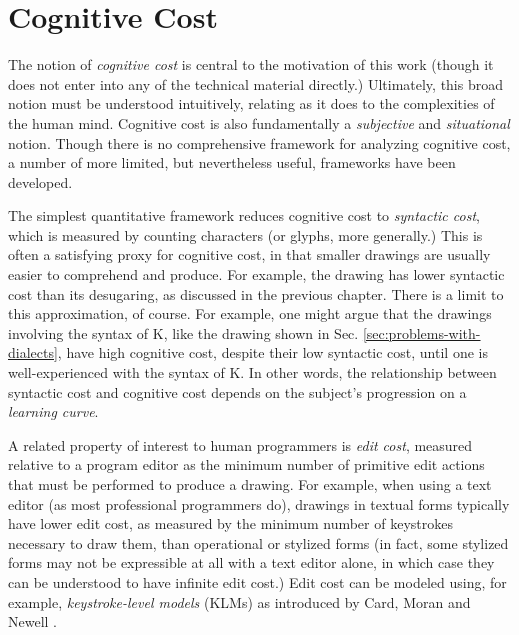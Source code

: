 
\section{Cognitive Cost}\label{sec:syntactic-properties}
The notion of \emph{cognitive cost} is central to the motivation of this work (though it does not enter into any of the technical material directly.) Ultimately, this broad notion must be understood intuitively, relating as it does to the complexities of the human mind. Cognitive cost is also fundamentally a \emph{subjective} and \emph{situational} notion. Though there is no comprehensive framework for analyzing cognitive cost, a number of more limited, but nevertheless useful, frameworks have been developed. %

The simplest quantitative framework reduces cognitive cost to \emph{syntactic cost}, which is measured by counting characters (or glyphs, more generally.) This is often a satisfying proxy for cognitive cost, in that smaller drawings are usually easier to comprehend and produce. For example, the drawing \li{[1, 2, 3, 4, 5]} has lower syntactic cost than its desugaring, as discussed in the previous chapter. There is a limit to this approximation, of course. For example, one might argue that the drawings involving the syntax of K, like the drawing shown in Sec. \ref{sec:problems-with-dialects}, have high cognitive cost, despite their low syntactic cost, until one is well-experienced with the syntax of K. In other words, the relationship between syntactic cost and cognitive cost depends on the subject's progression on a \emph{learning curve}.

A related property of interest to human programmers is \emph{edit cost}, measured relative to a program editor as the minimum number of primitive edit actions that must be performed to produce a drawing. For example, when using a text editor (as most professional programmers do), drawings in textual forms typically have lower edit cost, as measured by the minimum number of keystrokes necessary to draw them, than operational or stylized forms (in fact, some stylized forms may not be expressible at all with a text editor alone, in which case they can be understood to have infinite edit cost.) Edit cost can be modeled using, for example, \emph{keystroke-level models} (KLMs) as introduced by Card, Moran and Newell \cite{journals/cacm/CardMN80}.%

